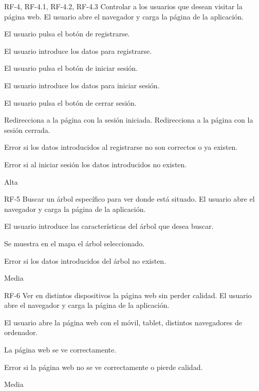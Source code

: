\newpage


{RF-4, RF-4.1, RF-4.2, RF-4.3}
{Controlar a los usuarios que desean visitar la página web.}
{El usuario abre el navegador y carga la página de la aplicación.}
{
	\item El usuario pulsa el botón de registrarse.
	\item El usuario introduce los datos para registrarse.
	\item El usuario pulsa el botón de iniciar sesión.
	\item El usuario introduce los datos para iniciar sesión.
	\item El usuario pulsa el botón de cerrar sesión.
}
{Redirecciona a la página con la sesión iniciada.
 Redirecciona a la página con la sesión cerrada.}
{
	\item Error si los datos introducidos al registrarse no son correctos o ya existen.
	\item Error si al iniciar sesión los datos introducidos no existen.
}
{Alta}

\newpage


{RF-5}
{Buscar un árbol específico para ver donde está situado.}
{El usuario abre el navegador y carga la página de la aplicación.}
{
	\item El usuario introduce las características del árbol que desea buscar.
}
{Se muestra en el mapa el árbol seleccionado.}
{
	\item Error si los datos introducidos del árbol no existen.
}
{Media}

\newpage


{RF-6}
{Ver en distintos dispositivos la página web sin perder calidad.}
{El usuario abre el navegador y carga la página de la aplicación.}
{
	\item El usuario abre la página web con el móvil, tablet, distintos navegadores de ordenador.
}
{La página web se ve correctamente.}
{
	\item Error si la página web no se ve correctamente o pierde calidad.
}
{Media}

\newpage